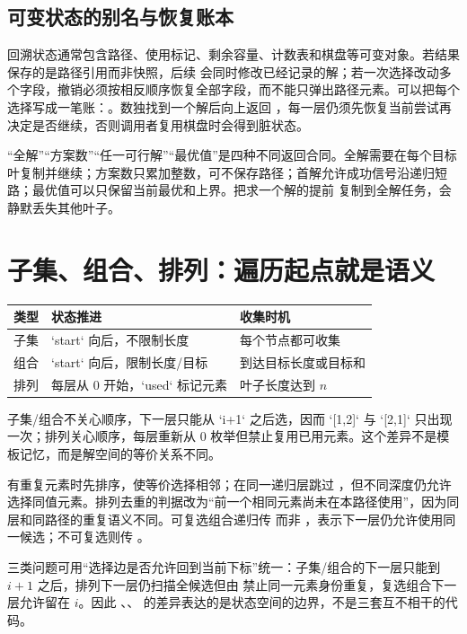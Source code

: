 \documentclass[UTF8,fontset=none,11pt,a4paper]{ctexart}
\begin{document}
\subsection{可变状态的别名与恢复账本}

回溯状态通常包含路径、使用标记、剩余容量、计数表和棋盘等可变对象。若结果保存的是路径引用而非快照，后续  会同时修改已经记录的解；若一次选择改动多个字段，撤销必须按相反顺序恢复全部字段，而不能只弹出路径元素。可以把每个选择写成一笔账：。数独找到一个解后向上返回 ，每一层仍须先恢复当前尝试再决定是否继续，否则调用者复用棋盘时会得到脏状态。

“全解”“方案数”“任一可行解”“最优值”是四种不同返回合同。全解需要在每个目标叶复制并继续；方案数只累加整数，可不保存路径；首解允许成功信号沿递归短路；最优值可以只保留当前最优和上界。把求一个解的提前  复制到全解任务，会静默丢失其他叶子。

\section{子集、组合、排列：遍历起点就是语义}

\begin{center}\small
\begin{tabularx}{\linewidth}{L{2.5cm}YY}
\toprule
类型 & 状态推进 & 收集时机\\\midrule
子集 & `start` 向后，不限制长度 & 每个节点都可收集\\
组合 & `start` 向后，限制长度/目标 & 到达目标长度或目标和\\
排列 & 每层从 0 开始，`used` 标记元素 & 叶子长度达到 $n$\\
\bottomrule
\end{tabularx}\end{center}

子集/组合不关心顺序，下一层只能从 `i+1` 之后选，因而 `[1,2]` 与 `[2,1]` 只出现一次；排列关心顺序，每层重新从 0 枚举但禁止复用已用元素。这个差异不是模板记忆，而是解空间的等价关系不同。

有重复元素时先排序，使等价选择相邻；在同一递归层跳过 ，但不同深度仍允许选择同值元素。排列去重的判据改为“前一个相同元素尚未在本路径使用”，因为同层和同路径的重复语义不同。可复选组合递归传  而非 ，表示下一层仍允许使用同一候选；不可复选则传 。

三类问题可用“选择边是否允许回到当前下标”统一：子集/组合的下一层只能到 $i+1$ 之后，排列下一层仍扫描全候选但由  禁止同一元素身份重复，复选组合下一层允许留在 $i$。因此 、、 的差异表达的是状态空间的边界，不是三套互不相干的代码。
\end{document}
